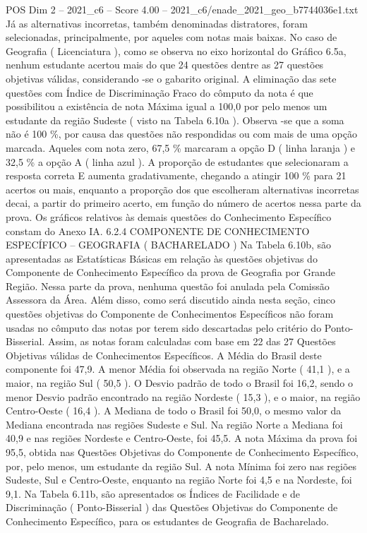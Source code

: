 \begin{textsample}{POS Dim 2 – 2021\_c6 – Score 4.00 – 2021\_c6/enade\_2021\_geo\_b7744036e1.txt}
Já as alternativas incorretas, também denominadas distratores, foram selecionadas, principalmente, por aqueles com notas mais baixas.
No caso de Geografia ( Licenciatura ), como se observa no eixo horizontal do Gráfico 6.5a, nenhum estudante acertou mais do que 24 questões dentre as 27 questões objetivas válidas, considerando -se o gabarito original.
A eliminação das sete questões com Índice de Discriminação Fraco do cômputo da nota é que possibilitou a existência de nota Máxima igual a 100,0 por pelo menos um estudante da região Sudeste ( visto na Tabela 6.10a ).
Observa -se que a soma não é 100 \%, por causa das questões não respondidas ou com mais de uma opção marcada.
Aqueles com nota zero, 67,5 \% marcaram a opção D ( linha laranja ) e 32,5 \% a opção A ( linha azul ).
A proporção de estudantes que selecionaram a resposta correta E aumenta gradativamente, chegando a atingir 100 \% para 21 acertos ou mais, enquanto a proporção dos que escolheram alternativas incorretas decai, a partir do primeiro acerto, em função do número de acertos nessa parte da prova.
Os gráficos relativos às demais questões do Conhecimento Específico constam do Anexo IA. 6.2.4 COMPONENTE DE CONHECIMENTO ESPECÍFICO – GEOGRAFIA ( BACHARELADO ) Na Tabela 6.10b, são apresentadas as Estatísticas Básicas em relação às questões objetivas do Componente de Conhecimento Específico da prova de Geografia por Grande Região.
Nessa parte da prova, nenhuma questão foi anulada pela Comissão Assessora da Área.
Além disso, como será discutido ainda nesta seção, cinco questões objetivas do Componente de Conhecimentos Específicos não foram usadas no cômputo das notas por terem sido descartadas pelo critério do Ponto-Bisserial.
Assim, as notas foram calculadas com base em 22 das 27 Questões Objetivas válidas de Conhecimentos Específicos.
A Média do Brasil deste componente foi 47,9.
A menor Média foi observada na região Norte ( 41,1 ), e a maior, na região Sul ( 50,5 ).
O Desvio padrão de todo o Brasil foi 16,2, sendo o menor Desvio padrão encontrado na região Nordeste ( 15,3 ), e o maior, na região Centro-Oeste ( 16,4 ).
A Mediana de todo o Brasil foi 50,0, o mesmo valor da Mediana encontrada nas regiões Sudeste e Sul.
Na região Norte a Mediana foi 40,9 e nas regiões Nordeste e Centro-Oeste, foi 45,5.
A nota Máxima da prova foi 95,5, obtida nas Questões Objetivas do Componente de Conhecimento Específico, por, pelo menos, um estudante da região Sul.
A nota Mínima foi zero nas regiões Sudeste, Sul e Centro-Oeste, enquanto na região Norte foi 4,5 e na Nordeste, foi 9,1.
Na Tabela 6.11b, são apresentados os Índices de Facilidade e de Discriminação ( Ponto-Bisserial ) das Questões Objetivas do Componente de Conhecimento Específico, para os estudantes de Geografia de Bacharelado.

\end{textsample}
